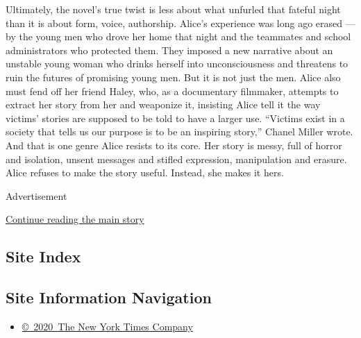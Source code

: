 Ultimately, the novel's true twist is less about what unfurled that
fateful night than it is about form, voice, authorship. Alice's
experience was long ago erased --- by the young men who drove her home
that night and the teammates and school administrators who protected
them. They imposed a new narrative about an unstable young woman who
drinks herself into unconsciousness and threatens to ruin the futures of
promising young men. But it is not just the men. Alice also must fend
off her friend Haley, who, as a documentary filmmaker, attempts to
extract her story from her and weaponize it, insisting Alice tell it the
way victims' stories are supposed to be told to have a larger use.
``Victims exist in a society that tells us our purpose is to be an
inspiring story,'' Chanel Miller wrote. And that is one genre Alice
resists to its core. Her story is messy, full of horror and isolation,
unsent messages and stifled expression, manipulation and erasure. Alice
refuses to make the story useful. Instead, she makes it hers.

Advertisement

\protect\hyperlink{after-bottom}{Continue reading the main story}

\hypertarget{site-index}{%
\subsection{Site Index}\label{site-index}}

\hypertarget{site-information-navigation}{%
\subsection{Site Information
Navigation}\label{site-information-navigation}}

\begin{itemize}
\tightlist
\item
  \href{https://help.nytimes3xbfgragh.onion/hc/en-us/articles/115014792127-Copyright-notice}{©~2020~The
  New York Times Company}
\end{itemize}

